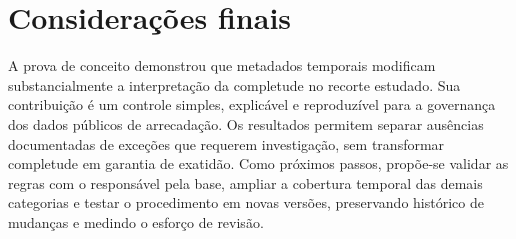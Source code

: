 \documentclass[12pt,a4paper]{article}
\begin{document}
\section{Considerações finais}
A prova de conceito demonstrou que metadados temporais modificam
substancialmente a interpretação da completude no recorte estudado. Sua
contribuição é um controle simples, explicável e reproduzível para a governança
dos dados públicos de arrecadação. Os resultados permitem separar ausências
documentadas de exceções que requerem investigação, sem transformar completude
em garantia de exatidão. Como próximos passos, propõe-se validar as regras com
o responsável pela base, ampliar a cobertura temporal das demais categorias e
testar o procedimento em novas versões, preservando histórico de mudanças e
medindo o esforço de revisão.

\clearpage

\begingroup\small{}

\endgroup
\end{document}
